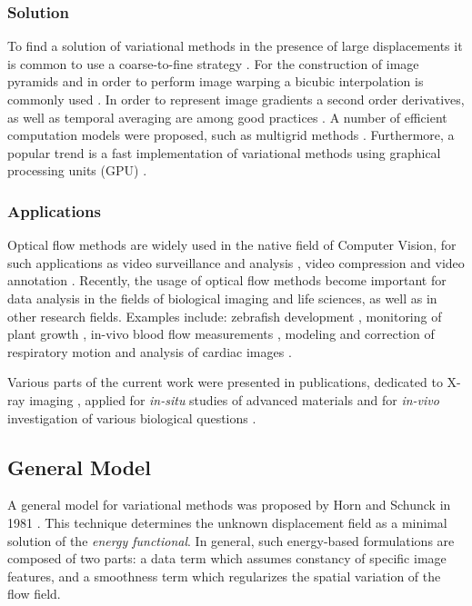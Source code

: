 \subsubsection{Solution}

To find a solution of variational methods in the presence of large displacements it is common to use a coarse-to-fine strategy \cite{Black96, Memin98, Brox04, Xu10}. For the construction of image pyramids and in order to perform image warping a bicubic interpolation is commonly used \cite{Sun10}.
In order to represent image gradients a second order derivatives, as well as temporal averaging are among good practices \cite{Wedel09, Sun14, HarmonyFlow}. A number of efficient computation models were proposed, such as multigrid methods \cite{Bruhn05, Bruhn06b}. Furthermore, a popular trend is a fast implementation of variational methods using graphical processing units (GPU) \cite{Wedel09, Gwosdek12, Bao14}.


\subsubsection{Applications}


Optical flow methods are widely used in the native field of Computer Vision, for such applications as video surveillance and analysis \cite{Kastrinaki03, Hu04}, video compression \cite{Wolf96} and video annotation \cite{Sudhir96}. Recently, the usage of optical flow methods become important for data analysis in the fields of biological imaging and life sciences, as well as in other research fields. Examples include: zebrafish development \cite{Amat13}, monitoring of plant growth \cite{Barron97}, in-vivo blood flow measurements \cite{Vennemann07}, modeling and correction of respiratory motion \cite{McClelland13} and analysis of cardiac images \cite{Xu10b}.


Various parts of the current work were presented in publications, dedicated to  X-ray imaging \cite{Baumbach09, Rack10, Altapova12}, applied for \textit{in-situ} studies of advanced materials \cite{Zabler10, Myagotin12, Zabler13} and for \textit{in-vivo} investigation of various biological questions \cite{Betz08, Nature13, van13, Moosmann14, dosSantosRolo14}. 


\subsection{General Model}
\label{general_model}

A general model for variational methods was proposed by Horn and Schunck in 1981 \cite{HornSchunck81}. This technique determines the unknown displacement field as a minimal solution of the  \textit{energy functional}. In general, such energy-based formulations are composed of two parts: a data term which assumes constancy of specific image features, and a smoothness term which regularizes the spatial variation of the flow field.
 
